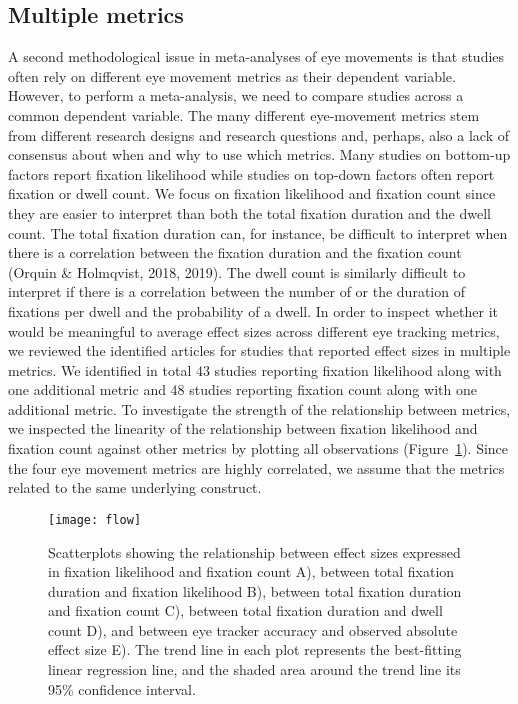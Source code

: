 \documentclass{article}
\begin{document}
\subsection{Multiple metrics}

A second methodological issue in meta-analyses of eye movements is that studies often rely on different eye movement metrics as their dependent variable. However, to perform a meta-analysis, we need to compare studies across a common dependent variable. The many different eye-movement metrics stem from different research designs and research questions and, perhaps, also a lack of consensus about when and why to use which metrics. Many studies on bottom-up factors report fixation likelihood while studies on top-down factors often report fixation or dwell count. We focus on fixation likelihood and fixation count since they are easier to interpret than both the total fixation duration and the dwell count. The total fixation duration can, for instance, be difficult to interpret when there is a correlation between the fixation duration and the fixation count (Orquin \& Holmqvist, 2018, 2019). The dwell count is similarly difficult to interpret if there is a correlation between the number of or the duration of fixations per dwell and the probability of a dwell. In order to inspect whether it would be meaningful to average effect sizes across different eye tracking metrics, we reviewed the identified articles for studies that reported effect sizes in multiple metrics. We identified in total $43$ studies reporting fixation likelihood along with one additional metric and $48$ studies reporting fixation count along with one additional metric. To investigate the strength of the relationship between metrics, we inspected the linearity of the relationship between fixation likelihood and fixation count against other metrics by plotting all observations (Figure~\ref{fig:scatter_fix_likelihood_count}). Since the four eye movement metrics are highly correlated, we assume that the metrics related to the same underlying construct. 


\begin{figure}[H]
\texttt{[image: flow]}
\centering
\caption{Scatterplots showing the relationship between effect sizes expressed in fixation likelihood and fixation count A), between total fixation duration and fixation likelihood B), between total fixation duration and fixation count C), between total fixation duration and dwell count D), and between eye tracker accuracy and observed absolute effect size E). The trend line in each plot represents the best-fitting linear regression line, and the shaded area around the trend line its 95\% confidence interval.}
\label{fig:scatter_fix_likelihood_count}
\end{figure}
\end{document}

